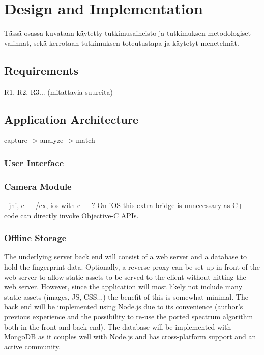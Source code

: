 \documentclass[thesis.tex]{subfiles}
\begin{document}
\chapter{Design and Implementation}
\label{chapter:design-implementation}

Tässä osassa kuvataan käytetty tutkimusaineisto ja tutkimuksen metodologiset valinnat, sekä kerrotaan tutkimuksen toteutustapa ja käytetyt menetelmät.


\section{Requirements}

R1, R2, R3... (mitattavia suureita)

\section{Application Architecture}

capture -> analyze -> match

\subsection{User Interface}

\subsection{Camera Module}
- jni, c++/cx, ios with c++?
 On iOS this extra bridge is unnecessary as C++ code can directly invoke Objective-C APIs.

\subsection{Offline Storage}

The underlying server back end will consist of a web server and a database to hold the fingerprint data. Optionally, a reverse proxy can be set up in front of the web server to allow static assets to be served to the client without hitting the web server. However, since the application will most likely not include many static assets (images, JS, CSS...) the benefit of this is somewhat minimal. The back end will be implemented using Node.js due to its convenience (author's previous experience and the possibility to re-use the ported spectrum algorithm both in the front and back end). The database will be implemented with MongoDB as it couples well with Node.js and has cross-platform support and an active community.
\end{document}

